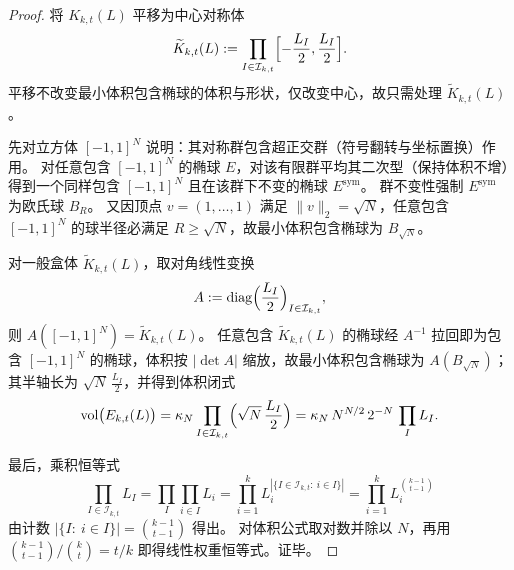\begin{proof}
将 \(K_{k,t}(L)\) 平移为中心对称体
\[
\widetilde K_{k,t}(L):=\prod_{I\in\mathcal I_{k,t}}\Bigl[-\frac{L_I}{2},\frac{L_I}{2}\Bigr].
\]
平移不改变最小体积包含椭球的体积与形状，仅改变中心，故只需处理 \(\widetilde K_{k,t}(L)\)。
\par
先对立方体 \([-1,1]^N\) 说明：其对称群包含超正交群（符号翻转与坐标置换）作用。
对任意包含 \([-1,1]^N\) 的椭球 \(E\)，对该有限群平均其二次型（保持体积不增）得到一个同样包含 \([-1,1]^N\) 且在该群下不变的椭球 \(E^{\mathrm{sym}}\)。
群不变性强制 \(E^{\mathrm{sym}}\) 为欧氏球 \(B_R\)。
又因顶点 \(v=(1,\dots,1)\) 满足 \(\|v\|_2=\sqrt N\)，任意包含 \([-1,1]^N\) 的球半径必满足 \(R\ge \sqrt N\)，故最小体积包含椭球为 \(B_{\sqrt N}\)。
\par
对一般盒体 \(\widetilde K_{k,t}(L)\)，取对角线性变换
\[
A:=\mathrm{diag}\Bigl(\frac{L_I}{2}\Bigr)_{I\in\mathcal I_{k,t}},
\]
则 \(A([-1,1]^N)=\widetilde K_{k,t}(L)\)。
任意包含 \(\widetilde K_{k,t}(L)\) 的椭球经 \(A^{-1}\) 拉回即为包含 \([-1,1]^N\) 的椭球，体积按 \(|\det A|\) 缩放，故最小体积包含椭球为 \(A(B_{\sqrt N})\)；
其半轴长为 \(\sqrt N\,\tfrac{L_I}{2}\)，并得到体积闭式
\[
\operatorname{vol}\bigl(E_{k,t}(L)\bigr)=\kappa_N\prod_{I\in\mathcal I_{k,t}}\Bigl(\sqrt N\,\frac{L_I}{2}\Bigr)
=\kappa_N\,N^{N/2}\,2^{-N}\,\prod_I L_I.
\]
\par
最后，乘积恒等式
\[
\prod_{I\in\mathcal I_{k,t}}L_I
=
\prod_{I}\prod_{i\in I}L_i
=
\prod_{i=1}^{k}L_i^{|\{I\in\mathcal I_{k,t}:\ i\in I\}|}
=
\prod_{i=1}^{k}L_i^{\binom{k-1}{t-1}}
\]
由计数 \(|\{I:\ i\in I\}|=\binom{k-1}{t-1}\) 得出。
对体积公式取对数并除以 \(N\)，再用
\(
\binom{k-1}{t-1}/\binom{k}{t}=t/k
\)
即得线性权重恒等式。证毕。
\end{proof}

